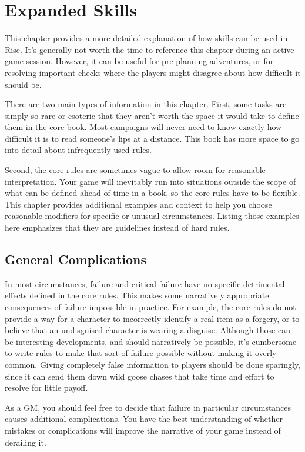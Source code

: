 \chapter{Expanded Skills}

This chapter provides a more detailed explanation of how skills can be used in Rise.
It's generally not worth the time to reference this chapter during an active game session.
However, it can be useful for pre-planning adventures, or for resolving important checks where the players might disagree about how difficult it should be.

There are two main types of information in this chapter.
First, some tasks are simply so rare or esoteric that they aren't worth the space it would take to define them in the core book.
Most campaigns will never need to know exactly how difficult it is to read someone's lips at a distance.
This book has more space to go into detail about infrequently used rules.

Second, the core rules are sometimes vague to allow room for reasonable interpretation.
Your game will inevitably run into situations outside the scope of what can be defined ahead of time in a book, so the core rules have to be flexible.
This chapter provides additional examples and context to help you choose reasonable modifiers for specific or unusual circumstances.
Listing those examples here emphasizes that they are guidelines instead of hard rules.

\section{General Complications}
    In most circumstances, failure and critical failure have no specific detrimental effects defined in the core rules.
    This makes some narratively appropriate consequences of failure impossible in practice.
    For example, the core rules do not provide a way for a character to incorrectly identify a real item as a forgery, or to believe that an undisguised character is wearing a disguise.
    Although those can be interesting developments, and should narratively be possible, it's cumbersome to write rules to make that sort of failure possible without making it overly common.
    Giving completely false information to players should be done sparingly, since it can send them down wild goose chases that take time and effort to resolve for little payoff.

    As a GM, you should feel free to decide that failure in particular circumstances causes additional complications.
    You have the best understanding of whether mistakes or complications will improve the narrative of your game instead of derailing it.

